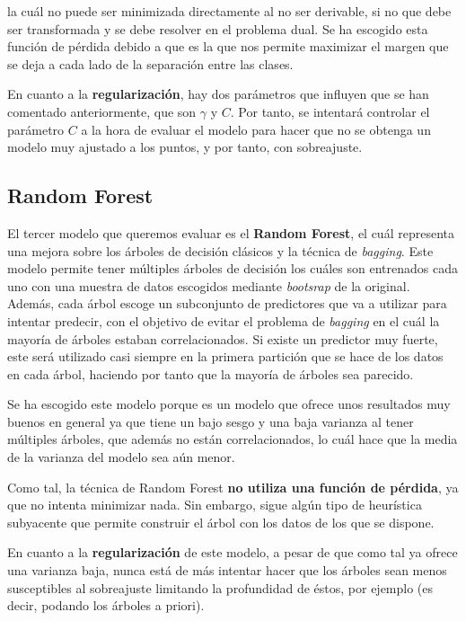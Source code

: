 \documentclass[11pt,a4paper]{article}
\begin{document}
\noindent la cuál no puede ser minimizada directamente al no ser derivable, si no que debe ser transformada y se debe resolver en el problema
dual. Se ha escogido esta función de pérdida debido a que es la que nos permite maximizar el margen que se deja a cada lado de la separación
entre las clases.

En cuanto a la \textbf{regularización}, hay dos parámetros que influyen que se han comentado anteriormente, que son $\gamma$ y $C$. Por tanto, se
intentará controlar el parámetro $C$ a la hora de evaluar el modelo para hacer que no se obtenga un modelo muy ajustado a los puntos, y por
tanto, con sobreajuste.

\subsection{Random Forest}

El tercer modelo que queremos evaluar es el \textbf{Random Forest}, el cuál representa una mejora sobre los árboles de decisión clásicos y la técnica
de \textit{bagging}. Este modelo permite tener múltiples árboles de decisión los cuáles son entrenados cada uno con una muestra de datos
escogidos mediante \textit{bootsrap} de la original. Además, cada árbol escoge un subconjunto de predictores que va a utilizar para intentar
predecir, con el objetivo de evitar el problema de \textit{bagging} en el cuál la mayoría de árboles estaban correlacionados. Si
existe un predictor muy fuerte, este será utilizado casi siempre en la primera partición que se hace de los datos en cada árbol, haciendo por
tanto que la mayoría de árboles sea parecido.

Se ha escogido este modelo porque es un modelo que ofrece unos resultados muy buenos en general ya que tiene un bajo sesgo y una baja varianza
al tener múltiples árboles, que además no están correlacionados, lo cuál hace que la media de la varianza del modelo sea aún menor.

Como tal, la técnica de Random Forest \textbf{no utiliza una función de pérdida}, ya que no intenta minimizar nada. Sin embargo, sigue algún tipo de
heurística subyacente que permite construir el árbol con los datos de los que se dispone.

En cuanto a la \textbf{regularización} de este modelo, a pesar de que como tal ya ofrece una varianza baja, nunca está de más intentar hacer que
los árboles sean menos susceptibles al sobreajuste limitando la profundidad de éstos, por ejemplo (es decir, podando los árboles a priori).
\end{document}
